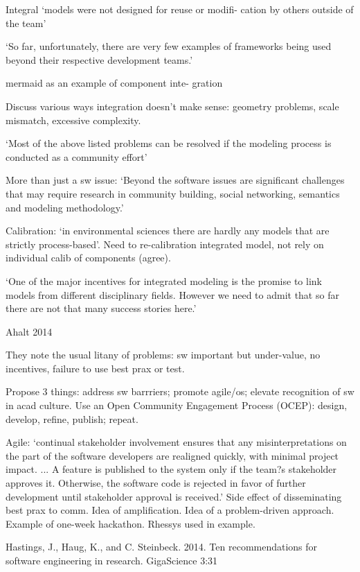\documentclass[12pt]{amsart}
\begin{document}
Integral `models were not designed for reuse or modifi- cation by others outside of the team'

`So far, unfortunately, there are very few examples of frameworks being used beyond their respective development teams.'

mermaid as an example of component inte- gration

Discuss various ways integration doesn't make sense: geometry problems, scale mismatch, excessive complexity.

`Most of the above listed problems can be resolved if the modeling process is conducted as a community effort'

More than just a sw issue: `Beyond the software issues are significant challenges that may require research in community building, social networking, semantics and modeling methodology.'

Calibration: `in environmental sciences there are hardly any models that are strictly process-based'. Need to re-calibration integrated model, not rely on individual calib of components (agree).

`One of the major incentives for integrated modeling is the promise to link models from different disciplinary fields. However we need to admit that so far there are not that many success stories here.'




Ahalt 2014

They note the usual litany of problems: sw important but under-value, no incentives, failure to use best prax or test. 

Propose 3 things: address sw barrriers; promote agile/os; elevate recognition of sw in acad culture. Use an Open Community Engagement Process (OCEP): design, develop, refine, publish; repeat.

Agile: `continual stakeholder involvement ensures that any misinterpretations on the part of the software developers are realigned quickly, with minimal project impact. ... A feature is published to the system only if the team?s stakeholder approves it. Otherwise, the software code is rejected in favor of further development until stakeholder approval is received.' Side effect of disseminating best prax to comm. Idea of amplification. Idea of a problem-driven approach. Example of one-week hackathon. Rhessys used in example.




Hastings, J., Haug, K., and C. Steinbeck. 2014. Ten recommendations for software engineering in research. GigaScience 3:31
\end{document}
